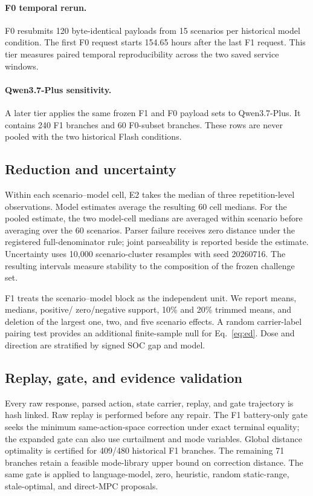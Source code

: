 \documentclass[11pt]{article}
\begin{document}
\paragraph{F0 temporal rerun.}
F0 resubmits 120 byte-identical payloads from 15 scenarios per historical model condition. The
first F0 request starts 154.65 hours after the last F1 request. This tier measures paired temporal
reproducibility across the two saved service windows.

\paragraph{Qwen3.7-Plus sensitivity.}
A later tier applies the same frozen F1 and F0 payload sets to Qwen3.7-Plus. It contains 240 F1
branches and 60 F0-subset branches. These rows are never pooled with the two historical Flash
conditions.

\subsection{Reduction and uncertainty}

Within each scenario--model cell, E2 takes the median of three repetition-level observations.
Model estimates average the resulting 60 cell medians. For the pooled estimate, the two model-cell
medians are averaged within scenario before averaging over the 60 scenarios. Parser failure
receives zero distance under the registered full-denominator rule; joint parseability is reported
beside the estimate.
Uncertainty uses 10,000 scenario-cluster resamples with seed 20260716. The resulting intervals
measure stability to the composition of the frozen challenge set.

F1 treats the scenario--model block as the independent unit. We report means, medians, positive/
zero/negative support, 10\% and 20\% trimmed means, and deletion of the largest one, two, and five
scenario effects. A random carrier-label pairing test provides an additional finite-sample null
for Eq.~\eqref{eq:ed}. Dose and direction are stratified by signed SOC gap and model.

\subsection{Replay, gate, and evidence validation}

Every raw response, parsed action, state carrier, replay, and gate trajectory is hash linked. Raw
replay is performed before any repair. The F1 battery-only gate seeks the minimum same-action-space
correction under exact terminal equality; the expanded gate can also use curtailment and mode
variables. Global distance optimality is certified for 409/480 historical F1 branches. The
remaining 71 branches retain a feasible mode-library upper bound on correction distance. The same
gate is applied to language-model, zero, heuristic, random static-range, stale-optimal, and
direct-MPC proposals.
\end{document}
